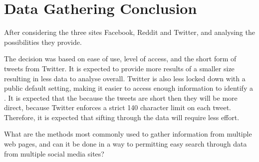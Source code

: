 \section{Data Gathering Conclusion}\label{sec:social-media-conclusion}
After considering the three sites Facebook, Reddit and Twitter, and
analysing the possibilities they provide.\nl


The decision was based on ease of use, level of access, and the short form of
tweets from Twitter. It is expected to provide more results of a smaller size
resulting in less data to analyse overall. Twitter is also less locked down with
a public default setting, making it easier to access enough information to
identify a \fb. It is expected that the because the tweets are short then they
will be more direct, because Twitter enforces a strict 140 character limit on each
tweet. Therefore, it is expected that sifting through the data will require less
effort.\nl

What are the methods most commonly used to gather information from multiple web
pages, and can it be done in a way to permitting easy search through data from
multiple social media sites?